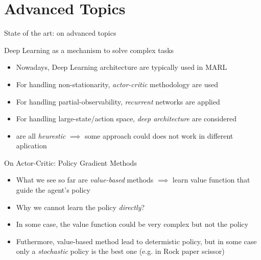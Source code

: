 \documentclass[presentation]{beamer}\mode<presentation>{\usetheme{AMSBolognaFC}}
\begin{document}
\section{Advanced Topics}
\begin{frame}{State of the art: on advanced topics}
	\begin{exampleblock}{Deep Learning as a mechanism to solve complex tasks}
		\begin{itemize}
			\item Nowadays, Deep Learning architecture are typically used in MARL
			\item For handling non-stationarity, \emph{actor-critic} methodology are used
			\item For handling partial-observability, \emph{recurrent} networks are applied
			\item For handling large-state/action space, \emph{deep architecture} are considered
			\item[{\color{red}\faThumbsDown}] are all \emph{heurestic} $\implies$ some approach could does not work in different aplication
		\end{itemize}
	\end{exampleblock}
\end{frame}

\begin{frame}{On Actor-Critic: Policy Gradient Methods}
	\begin{exampleblock}{}
		\begin{itemize}
			\item What we see so far are \emph{value-based} methods $\implies$ learn value function that guide the agent's policy
			\item[\faLightbulbO] Why we cannot learn the policy \emph{directly}?
			\item In some case, the value function could be very complex but not the policy
			\item Futhermore, value-based method lead to determistic policy, but in some case only a \emph{stochastic} policy is the best one (e.g. in Rock paper scissor)
		\end{itemize}
	\end{exampleblock}
\end{frame}
\end{document}
